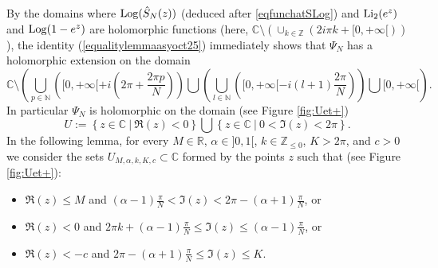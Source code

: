 \documentclass[11pt]{amsart}
\newcommand{\mr}{\mathbb{R}}
\newcommand{\mc}{\mathbb{C}}
\newcommand{\mz}{\mathbb{Z}}
\newcommand{\mn}{\mathbb{N}}
\newcommand{\Log}{{\rm Log}}
\begin{document}
{By the domains where $\Log(\hat{S}_N(z))$ (deduced after \eqref{eqfunchatSLog}) and ${\rm Li_2}(e^{z})$  and $\Log(1-e^{z})$ are holomorphic functions (here, $\textstyle \mc\setminus \left(\cup_{k\in \mz} \left(2i\pi k +[0,+\infty[\right)\right)$), the identity (\ref{equalitylemmaasyoct25}) immediately shows that $\Psi_N$ has a holomorphic extension on the domain 
\begin{equation}\label{holdomPsiN}
\mc \setminus \left(\bigcup_{p\in \mn} \left([0,+\infty[+i\left(2\pi + \frac{2\pi p}{N}\right)\right) \bigcup \left(\bigcup_{l\in \mn}\left( [0,+\infty[-i(l+1)\frac{2\pi}{N}\right)\right) \bigcup [0,+\infty[ \right).
\end{equation}
In particular $\Psi_N$ is holomorphic on the domain (see Figure \ref{fig:Uet+})
$$U:=\left \lbrace z\in \mc\ \vert\ \mathfrak{R}(z) <0 \right \rbrace \bigcup \left \lbrace z\in \mc\ \vert \ 0 < \mathfrak{I}(z) < 2\pi\right\rbrace.$$
In the following lemma, for every $M\in \mr$, $\alpha\in ]0,1[$, $k\in \mz_{\leq 0}$, $K>2\pi$, and $c>0$ we consider the sets $U_{M,\alpha,k,K,c}\subset \mc$ formed by the points $z$ such that (see Figure \ref{fig:Uet+}):
\begin{itemize}
\item $\mathfrak{R}(z)\leq M$ and $\textstyle (\alpha-1)\frac{\pi}{N}< \mathfrak{I}(z)< 2\pi-(\alpha+1)\frac{\pi}{N}$, or 
\item $\mathfrak{R}(z)<0$ and $\textstyle 2\pi k + (\alpha-1)\frac{\pi}{N}\leq \mathfrak{I}(z)\leq (\alpha-1)\frac{\pi}{N}$, or 
\item $\textstyle \mathfrak{R}(z)< -c$ and $\textstyle 2\pi-(\alpha+1)\frac{\pi}{N}\leq \mathfrak{I}(z)\leq K$.
\end{itemize}
\medskip

\begin{figure}[!h]
\end{figure}}
\end{document}
